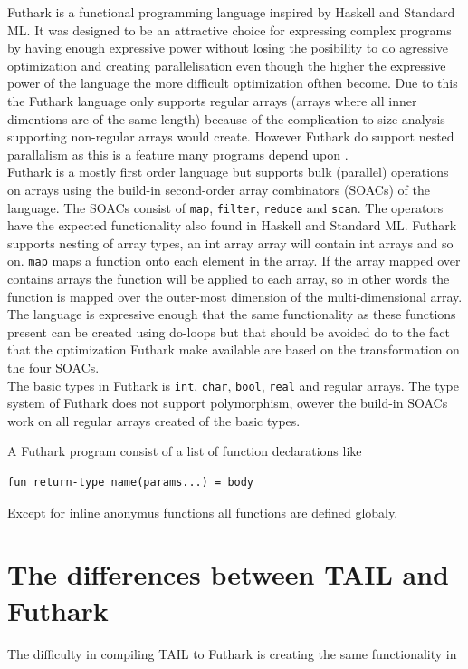 \documentclass[11pt]{article}
\begin{document}
Futhark is a functional programming language inspired by Haskell and Standard ML.
It was designed to be an attractive choice for expressing complex programs by having enough expressive power without
losing the posibility to do agressive optimization and creating parallelisation even though the higher the expressive power of the
language the more difficult optimization ofthen become.
Due to this the Futhark language only supports regular arrays (arrays where all inner dimentions are of the same length)
because of the complication to size analysis supporting non-regular arrays would create.
However Futhark do support nested parallalism as this is a feature many programs depend upon \cite{TroelsHenriksen}.\\

Futhark is a mostly first order language but supports bulk (parallel) operations on arrays
using the build-in second-order array combinators (SOACs) of the language. 
The SOACs consist of {\tt map}, {\tt filter}, {\tt reduce} and {\tt scan}.
The operators have the expected functionality also found in Haskell and Standard ML.
Futhark supports nesting of array types, an int array array will contain int arrays and so on.
{\tt map} maps a function onto each element in the array.
If the array mapped over contains arrays the function will be applied to each array,
so in other words the function is mapped over the outer-most dimension of the multi-dimensional array.
The language is expressive enough that the same functionality as these functions present can be created using do-loops
but that should be avoided do to the fact that the optimization Futhark make available are based on the
transformation on the four SOACs. \\

The basic types in Futhark is {\tt int}, {\tt char}, {\tt bool}, {\tt real} and regular arrays.
The type system of Futhark does not support polymorphism,
owever the build-in SOACs work on all regular arrays created of the basic types. 


A Futhark program consist of a list of function declarations like
\begin{lstlisting}[numbers=none,frame=none]
fun return-type name(params...) = body
\end{lstlisting}

Except for inline anonymus functions all functions are defined globaly. 

\section{The differences between TAIL and Futhark}
The difficulty in compiling TAIL to Futhark is creating the same functionality in 
\end{document}
